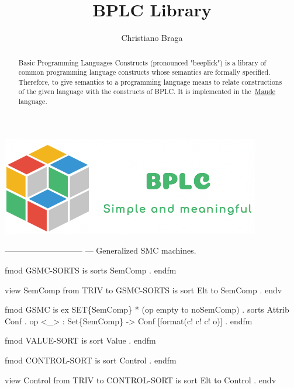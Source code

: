 \documentclass{llncs}%
\begin{document}
        
\title{BPLC Library}
\author{Christiano Braga\\}

\maketitle

\center \includegraphics[scale=0.45]{bplc-logo.png}

\begin{abstract}
Basic Programming Languages Constructs (pronounced "beeplick") is a library of common programming language constructs whose semantics are formally specified. Therefore, to give semantics to a programming language means to relate constructions of the given language with the constructs of BPLC. It is implemented in the~\href{http://maude.cs.uiuc.edu}{Maude} language.
\end{abstract}

\pagestyle{plain}

\endmoddef\nwstartdeflinemarkup\nwenddeflinemarkup
-----------------------------
--- Generalized SMC machines.

fmod GSMC-SORTS is
    sorts SemComp . 
endfm

view SemComp from TRIV to GSMC-SORTS is
    sort Elt to SemComp . 
endv

fmod GSMC is
    ex SET\{SemComp\} * (op empty to noSemComp) .
    sorts Attrib Conf .
    op <_> : Set\{SemComp\} -> Conf [format(c! c! c! o)] . 
endfm
\nwendcode{}\nwdocspar

\nwenddocs{}\endmoddef\nwstartdeflinemarkup\nwenddeflinemarkup
fmod VALUE-SORT is
    sort Value . 
endfm

fmod CONTROL-SORT is
    sort Control . 
endfm

view Control from TRIV to CONTROL-SORT is
    sort Elt to Control . 
endv
\end{document}
